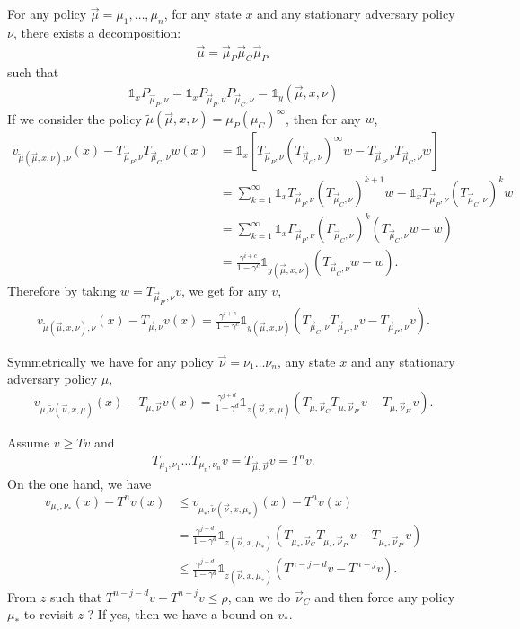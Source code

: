 \documentclass{article}
\author{Bruno Scherrer}
\def\1{{\mathds 1}}
\begin{document}
For any policy $\vec\mu=\mu_1,\dots,\mu_n$, for any state $x$ and any stationary adversary policy $\nu$, there exists a decomposition:
\begin{align}
\vec\mu = \vec\mu_P \vec\mu_C \vec\mu_{P'}
\end{align}
such that
\begin{align}
  \1_x P_{\vec\mu_P,\nu} = \1_x P_{\vec\mu_P,\nu} P_{\vec\mu_C,\nu} = \1_y(\vec\mu,x,\nu)
\end{align}
If we consider the policy $\tilde \mu(\vec\mu,x,\nu) = \mu_P (\mu_C)^\infty$, then for any $w$,
\begin{align}
  v_{\tilde\mu(\vec\mu,x,\nu),\nu}(x) - T_{\vec\mu_P,\nu}T_{\vec\mu_C,\nu} w(x) &= \1_x[  T_{\vec\mu_P,\nu} (T_{\vec\mu_C,\nu})^{\infty}w  - T_{\vec\mu_P,\nu}T_{\vec\mu_C,\nu} w] \\
  & = \sum_{k=1}^\infty \1_x T_{\vec\mu_P,\nu} (T_{\vec\mu_C,\nu})^{k+1} w - \1_x T_{\vec\mu_P,\nu} (T_{\vec\mu_C,\nu})^{k} w \\
  & =  \sum_{k=1}^\infty \1_x \Gamma_{\vec\mu_P,\nu} (\Gamma_{\vec\mu_C,\nu})^k (T_{\vec\mu_C,\nu} w - w) \\
  & = \frac{\gamma^{i+c}}{1-\gamma^c} \1_{y(\vec\mu,x,\nu)}  (T_{\vec\mu_C,\nu} w - w).
\end{align}
Therefore by taking $w=T_{\vec\mu_{P'},\nu} v$, we get for any $v$, 
\begin{align}
  v_{\tilde\mu(\vec\mu,x,\nu),\nu}(x) - T_{\vec\mu,\nu} v(x) = \frac{\gamma^{i+c}}{1-\gamma^c} \1_{y(\vec\mu,x,\nu)}  (T_{\vec\mu_C,\nu}T_{\vec\mu_{P'},\nu} v  - T_{\vec\mu_{P'},\nu} v).
\end{align}

Symmetrically we have for any policy $\vec\nu=\nu_1 \dots \nu_n$, any state $x$ and any stationary adversary policy $\mu$, 
\begin{align}
 v_{\mu,\tilde\nu(\vec\nu,x,\mu)}(x) - T_{\mu,\vec\nu} v(x) = \frac{\gamma^{j+d}}{1-\gamma^d} \1_{z(\vec\nu,x,\mu)}  (T_{\mu,\vec\nu_C}T_{\mu,\vec\nu_{P'}} v  - T_{\mu,\vec\nu_{P'}} v).
\end{align}

Assume $v \ge Tv$ and
\begin{align}
  T_{\mu_1,\nu_1} \dots T_{\mu_n,\nu_n}v = T_{\vec\mu,\vec\nu}v = T^n v. 
\end{align}
On the one hand, we have
\begin{align}
  v_{\mu_*,\nu_*}(x)-T^n v(x) &\le v_{\mu_*,\tilde\nu(\vec\nu,x,\mu_*)}(x)-T^n v(x) \\
  & = \frac{\gamma^{j+d}}{1-\gamma^d} \1_{z(\vec\nu,x,\mu_*)}  (T_{\mu_*,\vec\nu_C}T_{\mu_*,\vec\nu_{P'}} v  - T_{\mu_*,\vec\nu_{P'}} v) \\
  & \le \frac{\gamma^{j+d}}{1-\gamma^d} \1_{z(\vec\nu,x,\mu_*)}  (T^{n-j-d}v -T^{n-j}v).
\end{align}
From $z$ such that $T^{n-j-d}v -T^{n-j}v \le \rho$, can we do $\vec\nu_C$ and then force any policy $\mu_*$ to revisit $z$ ? If yes, then we have a bound on $v_*$.
\end{document}
